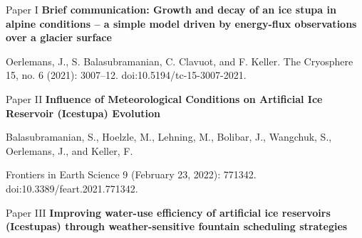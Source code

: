 \documentclass[a4paper, 11pt, oneside]{Thesis}  %
\begin{document}









\clearpage  %

\thispagestyle{plain}
\huge{Paper I}
\vfil\null
\huge{\textbf{Brief communication: Growth and decay of an ice stupa in alpine conditions – a simple model driven by energy-flux observations over a glacier surface}}

\bigskip
\large{
Oerlemans, J., S. Balasubramanian, C. Clavuot, and F. Keller. The Cryosphere 15, no. 6 (2021): 3007–12. doi:10.5194/tc-15-3007-2021.
  }




\clearpage  %

\thispagestyle{plain}
\huge{Paper II}
\vfil\null
\huge{\textbf{Influence of Meteorological Conditions on Artificial Ice Reservoir (Icestupa) Evolution}}

\bigskip
\large{Balasubramanian, S., Hoelzle, M., Lehning, M., Bolibar, J., Wangchuk, S.,
  Oerlemans, J., and Keller, F. \par  Frontiers in Earth Science 9 (February 23, 2022): 771342.
doi:10.3389/feart.2021.771342.}



\thispagestyle{plain}
\huge{Paper III}
\vfil\null
\huge{\textbf{Improving water-use efficiency of artificial ice reservoirs (Icestupas) through weather-sensitive fountain scheduling
strategies}}
\end{document}

